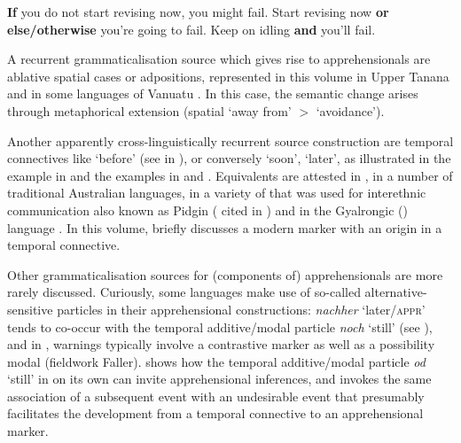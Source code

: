 \documentclass[output=paper,colorlinks,citecolor=brown]{langscibook}
\begin{document}
\ea\label{ex:intro24}
\ea\label{ex:intro24a} \textbf{If} you do not start revising now, you might fail.
\ex\label{ex:intro24b} Start revising now \textbf{or else/otherwise} you're going to fail.
\ex\label{ex:intro24c} Keep on idling \textbf{and} you'll fail.
\z
\z

 A recurrent grammaticalisation source which gives rise to apprehensionals are ablative spatial cases or adpositions, represented in this volume in Upper Tanana  \citep{chapters/lovick} and in some  languages of Vanuatu \citep{chapters/francois}. In this case, the semantic change arises through metaphorical extension (spatial `away from' $>$ `avoidance').

Another apparently cross-linguistically recurrent source construction are temporal connectives like `before' (see  in ), or conversely `soon', `later', as illustrated in the  example in  and the  examples in  and . Equivalents are attested in  \citep{boogaart2009,boogaart2020}, in a number of traditional Australian languages, in a variety of  that was used for interethnic communication also known as Pidgin  (\citealt{roberts2013} cited in \citealt[283]{angeloschultzeberndt2016}) and in the Gyalrongic () language  \citep[1419--1420]{jacques2021}. In this volume, \citet{chapters/francez} briefly discusses a modern  marker with an origin in a temporal connective.

Other grammaticalisation sources for (components of) apprehensionals are more rarely discussed. Curiously, some languages make use of so-called alternative{\hyp}sensitive particles in their apprehensional constructions:  \textit{nachher} `later/\textsc{appr}' tends to co-occur with the temporal additive/modal particle \textit{noch} `still' (see ), and in , warnings typically involve a contrastive marker as well as a possibility modal (fieldwork Faller). \citet{chapters/francez} shows how the temporal additive/modal particle \textit{od} `still' in  on its own can invite apprehensional inferences, and invokes the same association of a subsequent event with an undesirable event that presumably facilitates the development from a temporal connective to an apprehensional marker.
\end{document}

